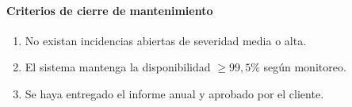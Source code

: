 \paragraph{Criterios de cierre de mantenimiento}
\begin{enumerate}[label=\alph*)]
  \item No existan incidencias abiertas de severidad media o alta.
  \item El sistema mantenga la disponibilidad \(\ge 99{,}5\%\) según monitoreo.
  \item Se haya entregado el informe anual y aprobado por el cliente.
\end{enumerate}